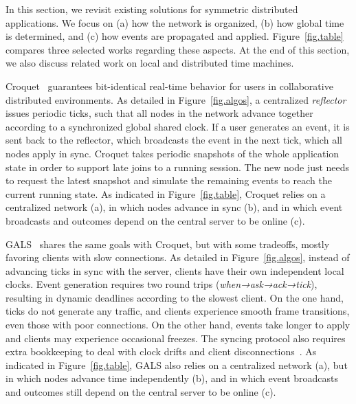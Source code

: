 \documentclass[12pt]{article}
\begin{document}
In this section, we revisit existing solutions for symmetric distributed
applications.
We focus on
    (a) how the network is organized,
    (b) how global time is determined, and
    (c) how events are propagated and applied.
Figure~\ref{fig.table} compares three selected works regarding these aspects.
%
At the end of this section, we also discuss related work on local and
distributed time machines.


Croquet~\cite{croquet,croquet.site} guarantees bit-identical real-time behavior
for users in collaborative distributed environments.
%
As detailed in Figure~\ref{fig.algos}, a centralized \emph{reflector} issues
periodic ticks, such that all nodes in the network advance together according
to a synchronized global shared clock.
If a user generates an event, it is sent back to the reflector, which
broadcasts the event in the next tick, which all nodes apply in sync.
%
Croquet takes periodic snapshots of the whole application state in order to
support late joins to a running session.
The new node just needs to request the latest snapshot and simulate the
remaining events to reach the current running state.
%
As indicated in Figure~\ref{fig.table}, Croquet relies on a centralized
network (a), in which nodes advance in sync (b), and in which event broadcasts
and outcomes depend on the central server to be online (c).

GALS~\cite{gals} shares the same goals with Croquet, but with some tradeoffs,
mostly favoring clients with slow connections.
As detailed in Figure~\ref{fig.algos}, instead of advancing ticks in sync with
the server, clients have their own independent local clocks.
Event generation requires two round trips (\emph{when→ask→ack→tick}), resulting
in dynamic deadlines according to the slowest client.
%
On the one hand, ticks do not generate any traffic, and clients experience
smooth frame transitions, even those with poor connections.
On the other hand, events take longer to apply and clients may experience
occasional freezes.
The syncing protocol also requires extra bookkeeping to deal with clock drifts
and client disconnections~\cite{gals}.
%
As indicated in Figure~\ref{fig.table}, GALS also relies on a centralized
network (a), but in which nodes advance time independently (b), and in which
event broadcasts and outcomes still depend on the central server to be online
(c).
\end{document}

